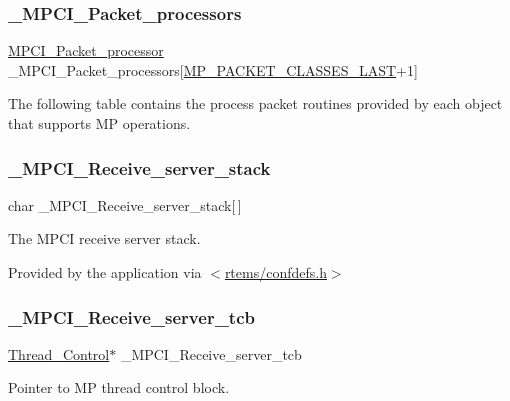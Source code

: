 \subsubsection{\texorpdfstring{\_MPCI\_Packet\_processors}{\_MPCI\_Packet\_processors}}
{\footnotesize\ttfamily \mbox{\hyperlink{group__RTEMSScoreMPCI_gafc97753e25c76740b182f3e8cdf74cc8}{M\+P\+C\+I\+\_\+\+Packet\+\_\+processor}} \+\_\+\+M\+P\+C\+I\+\_\+\+Packet\+\_\+processors\mbox{[}\mbox{\hyperlink{group__RTEMSScoreMPPacket_ga968e1b3a70aac1692b70ff42f9525bc7}{M\+P\+\_\+\+P\+A\+C\+K\+E\+T\+\_\+\+C\+L\+A\+S\+S\+E\+S\+\_\+\+L\+A\+ST}}+1\mbox{]}}

The following table contains the process packet routines provided by each object that supports MP operations. \mbox{\label{group__RTEMSScoreMPCI_ga1f31c9829798b2fa17bfae6891c93e9f}} 
\subsubsection{\texorpdfstring{\_MPCI\_Receive\_server\_stack}{\_MPCI\_Receive\_server\_stack}}
{\footnotesize\ttfamily char \+\_\+\+M\+P\+C\+I\+\_\+\+Receive\+\_\+server\+\_\+stack\mbox{[}$\,$\mbox{]}}



The M\+P\+CI receive server stack. 

Provided by the application via $<$\mbox{\hyperlink{confdefs_8h}{rtems/confdefs.\+h}}$>$ \mbox{\label{group__RTEMSScoreMPCI_gac0894f96d2d7e99feb038917fdb3c9cb}} 
\subsubsection{\texorpdfstring{\_MPCI\_Receive\_server\_tcb}{\_MPCI\_Receive\_server\_tcb}}
{\footnotesize\ttfamily \mbox{\hyperlink{struct__Thread__Control}{Thread\+\_\+\+Control}}$\ast$ \+\_\+\+M\+P\+C\+I\+\_\+\+Receive\+\_\+server\+\_\+tcb}



Pointer to MP thread control block. 

